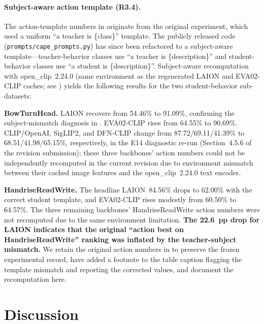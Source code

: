 \documentclass[symmetry,article,submit,pdftex,moreauthors]{Definitions/mdpi}
\begin{document}
\paragraph{Subject-aware action template (R3.4).}
The action-template numbers in  originate from the original experiment, which used a uniform ``a teacher is \{class\}'' template. The publicly released code (\texttt{prompts/cape\_prompts.py}) has since been refactored to a subject-aware template---teacher-behavior classes use ``a teacher is \{description\}'' and student-behavior classes use ``a student is \{description\}''. Subject-aware recomputation with open\_clip~2.24.0 (same environment as the regenerated LAION and EVA02-CLIP caches; see ) yields the following results for the two student-behavior sub-datasets:\par
\noindent\textbf{BowTurnHead.} LAION recovers from 54.46\% to 91.09\%, confirming the subject-mismatch diagnosis in . EVA02-CLIP rises from 64.55\% to 90.69\%. CLIP/OpenAI, SigLIP2, and DFN-CLIP change from 87.72/69.11/41.39\% to 68.51/41.98/65.15\%, respectively, in the E14 diagnostic re-run (Section~4.5.6 of the revision submission); these three backbones' action numbers could not be independently recomputed in the current revision due to environment mismatch between their cached image features and the open\_clip~2.24.0 text encoder.\par
\noindent\textbf{HandriseReadWrite.} The headline LAION~84.56\% drops to 62.00\% with the correct student template, and EVA02-CLIP rises modestly from 60.50\% to 64.57\%. The three remaining backbones' HandriseReadWrite action numbers were not recomputed due to the same environment limitation. \textbf{The 22.6~pp drop for LAION indicates that the original ``action best on HandriseReadWrite'' ranking was inflated by the teacher-subject mismatch.} We retain the original action numbers in  to preserve the frozen experimental record, have added a footnote to the table caption flagging the template mismatch and reporting the corrected values, and document the recomputation here.


\section{Discussion}
\label{sec:discussion}
\end{document}

